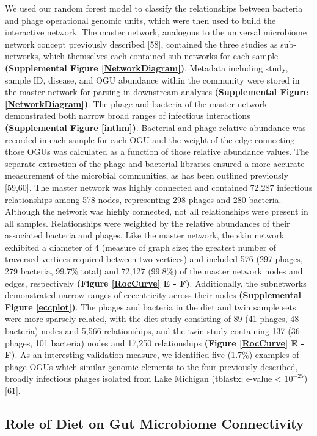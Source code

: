 \documentclass[12pt,]{article}
\begin{document}
We used our random forest model to classify the relationships between
bacteria and phage operational genomic units, which were then used to
build the interactive network. The master network, analogous to the
universal microbiome network concept previously described {[}58{]},
contained the three studies as sub-networks, which themselves each
contained sub-networks for each sample \textbf{(Supplemental Figure
\ref{NetworkDiagram})}. Metadata including study, sample ID, disease,
and OGU abundance within the community were stored in the master network
for parsing in downstream analyses \textbf{(Supplemental Figure
\ref{NetworkDiagram})}. The phage and bacteria of the master network
demonstrated both narrow broad ranges of infectious interactions
\textbf{(Supplemental Figure \ref{inthm})}. Bacterial and phage relative
abundance was recorded in each sample for each OGU and the weight of the
edge connecting those OGUs was calculated as a function of those
relative abundance values. The separate extraction of the phage and
bacterial libraries ensured a more accurate measurement of the microbial
communities, as has been outlined previously {[}59,60{]}. The master
network was highly connected and contained 72,287 infectious
relationships among 578 nodes, representing 298 phages and 280 bacteria.
Although the network was highly connected, not all relationships were
present in all samples. Relationships were weighted by the relative
abundances of their associated bacteria and phages. Like the master
network, the skin network exhibited a diameter of 4 (measure of graph
size; the greatest number of traversed vertices required between two
vertices) and included 576 (297 phages, 279 bacteria, 99.7\% total) and
72,127 (99.8\%) of the master network nodes and edges, respectively
\textbf{(Figure \ref{RocCurve} E - F)}. Additionally, the subnetworks
demonstrated narrow ranges of eccentricity across their nodes
\textbf{(Supplemental Figure \ref{eccplot})}. The phages and bacteria in
the diet and twin sample sets were more sparsely related, with the diet
study consisting of 89 (41 phages, 48 bacteria) nodes and 5,566
relationships, and the twin study containing 137 (36 phages, 101
bacteria) nodes and 17,250 relationships \textbf{(Figure \ref{RocCurve}
E - F)}. As an interesting validation measure, we identified five
(1.7\%) examples of phage OGUs which similar genomic elements to the
four previously described, broadly infectious phages isolated from Lake
Michigan (tblastx; e-value \textless{} \(10^{-25}\)) {[}61{]}.

\subsection{Role of Diet on Gut Microbiome
Connectivity}\label{role-of-diet-on-gut-microbiome-connectivity}
\end{document}
